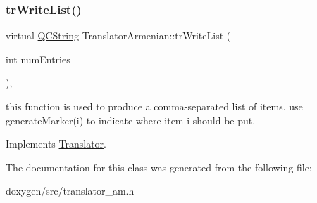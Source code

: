 \subsubsection{\texorpdfstring{trWriteList()}{trWriteList()}}
{\footnotesize\ttfamily virtual \mbox{\hyperlink{class_q_c_string}{Q\+C\+String}} Translator\+Armenian\+::tr\+Write\+List (\begin{DoxyParamCaption}\item[{int}]{num\+Entries }\end{DoxyParamCaption})\hspace{0.3cm}{\ttfamily [inline]}, {\ttfamily [virtual]}}

this function is used to produce a comma-\/separated list of items. use generate\+Marker(i) to indicate where item i should be put. 

Implements \mbox{\hyperlink{class_translator}{Translator}}.



The documentation for this class was generated from the following file\+:\begin{DoxyCompactItemize}
\item 
doxygen/src/translator\+\_\+am.\+h\end{DoxyCompactItemize}
